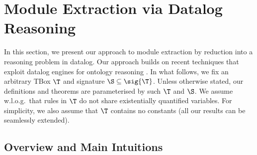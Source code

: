 
\section{Module Extraction via Datalog Reasoning} \label{sec:module-settings}

 
In this section, we present our approach to module extraction
by reduction into a reasoning problem in datalog. 
Our approach builds on recent techniques
that exploit datalog engines for 
ontology reasoning 
\cite{DBLP:conf/ijcai/KontchakovLTWZ11,stefanoni2013introducing,DBLP:conf/aaai/ZhouNGH14}.
In what follows, we fix an arbitrary
TBox $\T$ and signature $\S\subseteq\sig{\T}$. Unless otherwise stated,
our definitions and theorems are parameterised
by such $\T$ and $\S$. We assume
w.l.o.g.\ that rules in $\T$ do not
share existentially quantified variables.
For simplicity, we also 
assume that $\T$ contains no constants 
(all our results can be
seamlessly extended). 

\subsection{Overview and Main Intuitions}\label{sec:overview}

